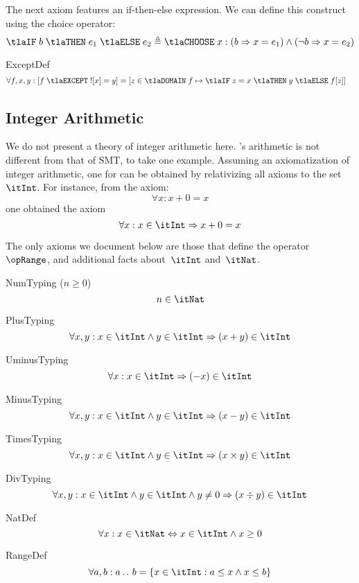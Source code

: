 \documentclass[11pt, a4paper, oneside]{article}
\begin{document}
The next axiom features an if-then-else expression.  We can define this construct using the choice operator: \[
    \tlaIF\; b \;\tlaTHEN\; e_1 \;\tlaELSE\; e_2 \triangleq \tlaCHOOSE\; x : (b \imp x = e_1) \wedge (\neg b \imp x = e_2)
\]

\begin{axioms}
\item[ExceptDef] \[
        \begin{aligned}
            &\forall f, x, y : \bx{ f \;\tlaEXCEPT\; !\!\bx{x} = y } = \bx{ z \in \tlaDOMAIN\; f \mapsto \tlaIF\; z = x \;\tlaTHEN\; y \;\tlaELSE\; f\!\bx{z} }
        \end{aligned}
    \]

\end{axioms}


    \subsection{Integer Arithmetic}
    \label{subsec:ints}

We do not present a theory of integer arithmetic here.  \TLA's arithmetic is not different from that of SMT, to take one example.  Assuming an axiomatization of integer arithmetic, one for \TLA can be obtained by relativizing all axioms to the set~$\itInt$.  For instance, from the axiom: \[
    \forall x : x + 0 = x
\] one obtained the \TLA axiom \[
    \forall x : x \in \itInt \imp x + 0 = x
\]

The only axioms we document below are those that define the operator~$\opRange$, and additional facts about~$\itInt$ and~$\itNat$.

\begin{axioms}
\item[NumTyping ($n \ge 0$)] \[
        n \in \itNat
    \]

\item[PlusTyping] \[
        \forall x, y : x \in \itInt \wedge y \in \itInt \imp (x + y) \in \itInt
    \]

\item[UminusTyping] \[
        \forall x : x \in \itInt \imp (- x) \in \itInt
    \]

\item[MinusTyping] \[
        \forall x, y : x \in \itInt \wedge y \in \itInt \imp (x - y) \in \itInt
    \]

\item[TimesTyping] \[
        \forall x, y : x \in \itInt \wedge y \in \itInt \imp (x \times y) \in \itInt
    \]

\item[DivTyping] \[
        \forall x, y : x \in \itInt \wedge y \in \itInt \wedge y \neq 0 \imp (x \div y) \in \itInt
    \]

\item[NatDef] \[
        \forall x : x \in \itNat \eqv x \in \itInt \wedge x \ge 0
    \]

\item[RangeDef] \[
        \forall a, b : a \ltwodots b = \st{ x \in \itInt : a \le x \wedge x \le b }
    \]

\end{axioms}
\end{document}
